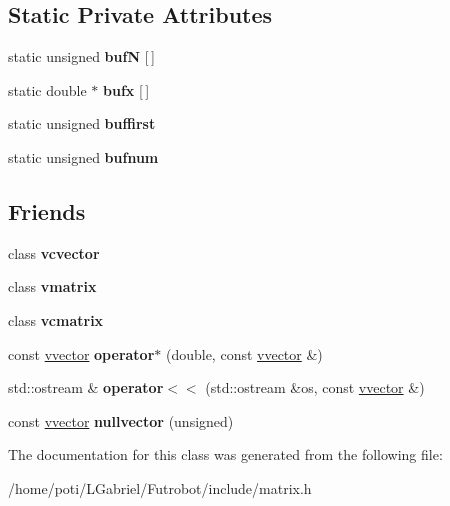 \subsection*{Static Private Attributes}
\begin{DoxyCompactItemize}
\item 
static unsigned {\bfseries bufN} \mbox{[}$\,$\mbox{]}\hypertarget{classvvector_ac0d63de74111a89fdd7b8820f53012da}{}\label{classvvector_ac0d63de74111a89fdd7b8820f53012da}

\item 
static double $\ast$ {\bfseries bufx} \mbox{[}$\,$\mbox{]}\hypertarget{classvvector_a6bdd242f2bef8118230e53ec797ed8c2}{}\label{classvvector_a6bdd242f2bef8118230e53ec797ed8c2}

\item 
static unsigned {\bfseries buffirst}\hypertarget{classvvector_a134e901387373feee34c0a3ec0009ef8}{}\label{classvvector_a134e901387373feee34c0a3ec0009ef8}

\item 
static unsigned {\bfseries bufnum}\hypertarget{classvvector_a28095ab338b9865050f584199102ea17}{}\label{classvvector_a28095ab338b9865050f584199102ea17}

\end{DoxyCompactItemize}
\subsection*{Friends}
\begin{DoxyCompactItemize}
\item 
class {\bfseries vcvector}\hypertarget{classvvector_a57a5699049f52275a82ce9168124f639}{}\label{classvvector_a57a5699049f52275a82ce9168124f639}

\item 
class {\bfseries vmatrix}\hypertarget{classvvector_ac6d075ce0dd9269d283dd58eac5d8e75}{}\label{classvvector_ac6d075ce0dd9269d283dd58eac5d8e75}

\item 
class {\bfseries vcmatrix}\hypertarget{classvvector_a262d03e4aeb778d2fd1c2a00daa45cbc}{}\label{classvvector_a262d03e4aeb778d2fd1c2a00daa45cbc}

\item 
const \hyperlink{classvvector}{vvector} {\bfseries operator$\ast$} (double, const \hyperlink{classvvector}{vvector} \&)\hypertarget{classvvector_a357081c7515460dbfe33ec00672d7e90}{}\label{classvvector_a357081c7515460dbfe33ec00672d7e90}

\item 
std\+::ostream \& {\bfseries operator$<$$<$} (std\+::ostream \&os, const \hyperlink{classvvector}{vvector} \&)\hypertarget{classvvector_ae6236f67dfa428e22251f7870d916e65}{}\label{classvvector_ae6236f67dfa428e22251f7870d916e65}

\item 
const \hyperlink{classvvector}{vvector} {\bfseries nullvector} (unsigned)\hypertarget{classvvector_ae999e5f5af3a55bbc7c4219705a4fbfe}{}\label{classvvector_ae999e5f5af3a55bbc7c4219705a4fbfe}

\end{DoxyCompactItemize}


The documentation for this class was generated from the following file\+:\begin{DoxyCompactItemize}
\item 
/home/poti/\+L\+Gabriel/\+Futrobot/include/matrix.\+h\end{DoxyCompactItemize}
